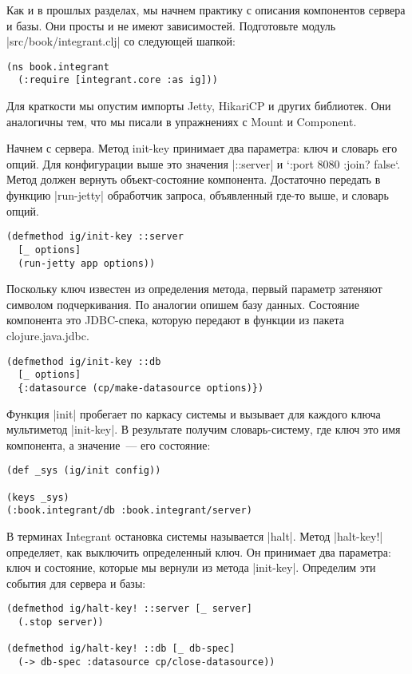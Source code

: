 Как и в прошлых разделах, мы начнем практику с описания компонентов сервера и
базы. Они просты и не имеют зависимостей. Подготовьте модуль
\spverb|src/book/integrant.clj| со следующей шапкой:

\begin{verbatim}
(ns book.integrant
  (:require [integrant.core :as ig]))
\end{verbatim}

Для краткости мы опустим импорты Jetty, HikariCP и других библиотек. Они
аналогичны тем, что мы писали в упражнениях с Mount и Component.

Начнем с сервера. Метод init-key принимает два параметра: ключ и словарь его
опций. Для конфигурации выше это значения \spverb|::server| и `{:port 8080 :join?
false}`. Метод должен вернуть объект-состояние компонента. Достаточно передать в
функцию \spverb|run-jetty| обработчик запроса, объявленный где-то выше, и словарь
опций.

\begin{verbatim}
(defmethod ig/init-key ::server
  [_ options]
  (run-jetty app options))
\end{verbatim}

Поскольку ключ известен из определения метода, первый параметр затеняют символом
подчеркивания. По аналогии опишем базу данных. Состояние компонента это
JDBC-спека, которую передают в функции из пакета clojure.java.jdbc.

\begin{verbatim}
(defmethod ig/init-key ::db
  [_ options]
  {:datasource (cp/make-datasource options)})
\end{verbatim}

Функция \spverb|init| пробегает по каркасу системы и вызывает для каждого ключа
мультиметод \spverb|init-key|. В результате получим словарь-систему, где ключ это имя
компонента, а значение~--- его состояние:

\begin{verbatim}
(def _sys (ig/init config))

(keys _sys)
(:book.integrant/db :book.integrant/server)
\end{verbatim}

В терминах Integrant остановка системы называется \spverb|halt|. Метод \spverb|halt-key!|
определяет, как выключить определенный ключ. Он принимает два параметра: ключ и
состояние, которые мы вернули из метода \spverb|init-key|. Определим эти события для
сервера и базы:

\begin{verbatim}
(defmethod ig/halt-key! ::server [_ server]
  (.stop server))

(defmethod ig/halt-key! ::db [_ db-spec]
  (-> db-spec :datasource cp/close-datasource))
\end{verbatim}

